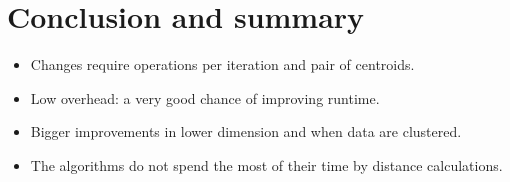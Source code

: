 \documentclass[10pt, compress]{beamer}
\newcommand{\plotwidth}{\textwidth}
\newcommand{\plotheight}{0.6\textwidth}
\newcommand{\strongplot}[1]{\color{gray}{#1}}
\newcommand{\x}{\vec{x}}
\newcommand{\ux}{u(\x)}
\begin{document}


\section{Conclusion and summary}

\begin{frame}
  \begin{itemize}
    \item Changes require operations per iteration and pair of centroids.
    \item Low overhead: a very good chance of improving runtime.
    \item Bigger improvements in lower dimension and when data are clustered.
    \item The algorithms do not spend the most of their time by distance calculations.
  \end{itemize}
\end{frame}
\end{document}
